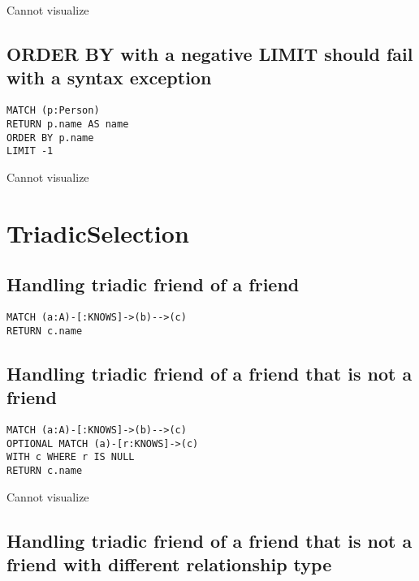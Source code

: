 Cannot visualize
\subsection{ORDER BY with a negative LIMIT should fail with a syntax exception}

\begin{lstlisting}
MATCH (p:Person)
RETURN p.name AS name
ORDER BY p.name
LIMIT -1
\end{lstlisting}

Cannot visualize
\section{TriadicSelection}

\subsection{Handling triadic friend of a friend}

\begin{lstlisting}
MATCH (a:A)-[:KNOWS]->(b)-->(c)
RETURN c.name
\end{lstlisting}

\subsection{Handling triadic friend of a friend that is not a friend}

\begin{lstlisting}
MATCH (a:A)-[:KNOWS]->(b)-->(c)
OPTIONAL MATCH (a)-[r:KNOWS]->(c)
WITH c WHERE r IS NULL
RETURN c.name
\end{lstlisting}

Cannot visualize
\subsection{Handling triadic friend of a friend that is not a friend with different relationship type}

